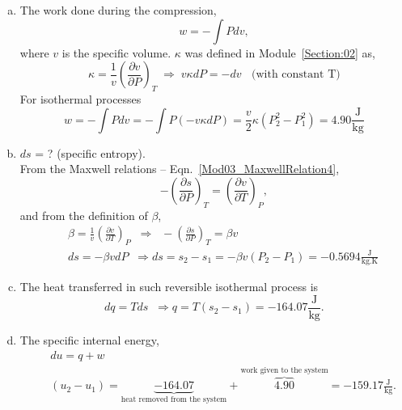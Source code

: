 \documentclass[12pts,a4paper,amsmath,amssymb,floatfix]{article}%
\newcommand{\frc}{\displaystyle\frac}
\begin{document}
\begin{enumerate}[1)]
       \begin{enumerate}[a)]
%
            \item The work done during the compression,
                \begin{displaymath}
                   w = -\int P dv,
                \end{displaymath}
                where $v$ is the specific volume. $\kappa$ was defined in Module~\ref{Section:02} as,
                \begin{displaymath}
                   \kappa = \frc{1}{v}\left(\frc{\partial v}{\partial P}\right)_{T}\;\Longrightarrow \; v\kappa dP = - dv \;\;\text{ (with constant T)}
                \end{displaymath}
                For isothermal processes
                \begin{displaymath}
                   w = -\int P dv = - \int P\left(-v\kappa dP\right) = \frc{v}{2}\kappa\left(P_{2}^{2}-P_{1}^{2}\right) = 4.90 \frc{\text{J}}{\text{kg}}
                \end{displaymath}
%
            \item $ds$ = ? (specific entropy).\\
                  From the Maxwell relations -- Eqn.~\ref{Mod03_MaxwellRelation4}, 
                \begin{displaymath}
                   -\left(\frc{\partial s}{\partial P}\right)_{T} = \left(\frc{\partial v}{\partial T}\right)_{P},
                \end{displaymath}
                and from the definition of $\beta$,
                \begin{eqnarray}
                    && \beta = \frc{1}{v}\left(\frc{\partial v}{\partial T}\right)_{P} \;\;\Longrightarrow\;\; -\left(\frc{\partial s}{\partial P}\right)_{T} = \beta v \nonumber \\
                    && ds = -\beta v dP \;\;\Longrightarrow ds = s_{2}-s_{1} = -\beta v \left(P_{2}-P_{1}\right) = -0.5694 \frc{\text{J}}{\text{kg.K}} \nonumber
                \end{eqnarray}
%
            \item The heat transferred in such reversible isothermal process is
                \begin{displaymath}
                   dq = Tds \;\;\Longrightarrow q = T\left(s_{2}-s_{1}\right) = -164.07 \frc{\text{J}}{\text{kg}}.
                \end{displaymath}
%
            \item The specific internal energy,
                \begin{eqnarray}
                   &&  du = q + w \nonumber \\
                   && \left(u_{2}-u_{1}\right) = \underbrace{-164.07}_{\text{heat removed from the system}} + \overbrace{4.90}^{\text{work given to the system}} = -159.17 \frc{\text{J}}{\text{kg}}. \nonumber
                \end{eqnarray}
 

\end{enumerate}
\end{enumerate}
\end{document}
